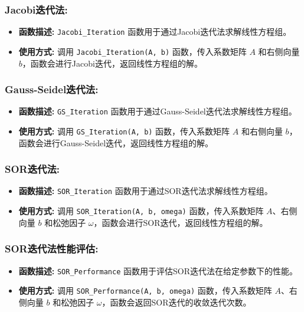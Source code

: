 \documentclass{article}
\begin{document}
\subsubsection*{Jacobi迭代法:}
\begin{itemize}
	\item \textbf{函数描述:} \texttt{Jacobi\_Iteration} 函数用于通过Jacobi迭代法求解线性方程组。
	\item \textbf{使用方式:} 调用 \texttt{Jacobi\_Iteration(A, b)} 函数，传入系数矩阵 $A$ 和右侧向量 $b$，函数会进行Jacobi迭代，返回线性方程组的解。
\end{itemize}

\subsubsection*{Gauss-Seidel迭代法:}
\begin{itemize}
	\item \textbf{函数描述:} \texttt{GS\_Iteration} 函数用于通过Gauss-Seidel迭代法求解线性方程组。
	\item \textbf{使用方式:} 调用 \texttt{GS\_Iteration(A, b)} 函数，传入系数矩阵 $A$ 和右侧向量 $b$，函数会进行Gauss-Seidel迭代，返回线性方程组的解。
\end{itemize}

\subsubsection*{SOR迭代法:}
\begin{itemize}
	\item \textbf{函数描述:} \texttt{SOR\_Iteration} 函数用于通过SOR迭代法求解线性方程组。
	\item \textbf{使用方式:} 调用 \texttt{SOR\_Iteration(A, b, omega)} 函数，传入系数矩阵 $A$、右侧向量 $b$ 和松弛因子 $\omega$，函数会进行SOR迭代，返回线性方程组的解。
\end{itemize}

\subsubsection*{SOR迭代法性能评估:}
\begin{itemize}
	\item \textbf{函数描述:} \texttt{SOR\_Performance} 函数用于评估SOR迭代法在给定参数下的性能。
	\item \textbf{使用方式:} 调用 \texttt{SOR\_Performance(A, b, omega)} 函数，传入系数矩阵 $A$、右侧向量 $b$ 和松弛因子 $\omega$，函数会返回SOR迭代的收敛迭代次数。
\end{itemize}
\end{document}
